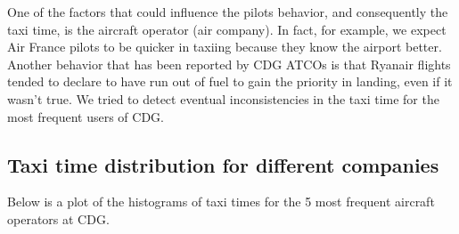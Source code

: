 \documentclass{article}
\begin{document}
One of the factors that could influence the pilots behavior, and consequently the taxi time, is the aircraft operator (air company). In fact, for example, we expect Air France pilots to be quicker in taxiing because they know the airport better. Another behavior that has been reported by CDG ATCOs is that Ryanair flights tended to declare to have run out of fuel to gain the priority in landing, even if it wasn't true. We tried to detect eventual inconsistencies in the taxi time for the most frequent users of CDG.

\subsection{Taxi time distribution for different companies}
Below is a plot of the histograms of taxi times for the 5 most frequent aircraft operators at CDG.
\end{document}
